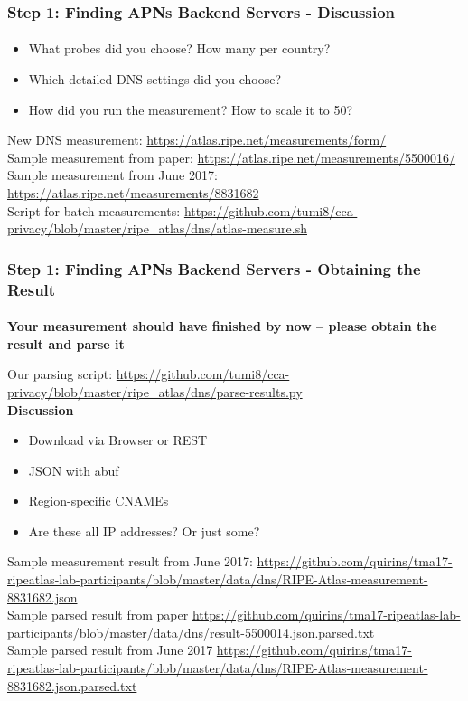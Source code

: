\begin{frame}
\frametitle{Step 1: Finding APNs Backend Servers - Discussion}
\framesubtitle{}
\begin{itemize}
	\item What probes did you choose? How many per country?
	\item Which detailed DNS settings did you choose?
	\item How did you run the measurement? How to scale it to 50?
\end{itemize}
New DNS measurement: \url{https://atlas.ripe.net/measurements/form/} \\
Sample measurement from paper: \url{https://atlas.ripe.net/measurements/5500016/} \\
Sample measurement from June 2017: \url{https://atlas.ripe.net/measurements/8831682} \\
Script for batch measurements: \url{https://github.com/tumi8/cca-privacy/blob/master/ripe\_atlas/dns/atlas-measure.sh} \\

\end{frame}
\clearpage
\begin{frame}
\frametitle{Step 1: Finding APNs Backend Servers - Obtaining the Result}
\framesubtitle{}
\textbf{Your measurement should have finished by now -- please obtain the result and parse it} 

Our parsing script: \url{https://github.com/tumi8/cca-privacy/blob/master/ripe\_atlas/dns/parse-results.py}\\

\pause
 \textbf{Discussion}
 \vspace{-5mm}
\begin{itemize}
	\item Download via Browser or REST
	\item JSON with abuf
	\item Region-specific CNAMEs
	\item Are these all IP addresses? Or just some?
\end{itemize}
\small{
Sample measurement result from June 2017: \url{https://github.com/quirins/tma17-ripeatlas-lab-participants/blob/master/data/dns/RIPE-Atlas-measurement-8831682.json}\\
Sample parsed result from paper \url{https://github.com/quirins/tma17-ripeatlas-lab-participants/blob/master/data/dns/result-5500014.json.parsed.txt} \\
Sample parsed result from June 2017 \url{https://github.com/quirins/tma17-ripeatlas-lab-participants/blob/master/data/dns/RIPE-Atlas-measurement-8831682.json.parsed.txt}\\
}

\end{frame}
\clearpage

